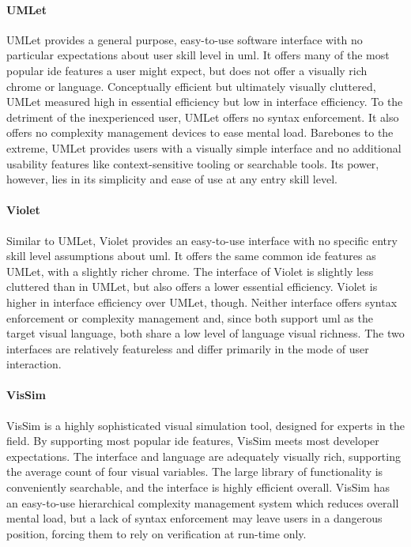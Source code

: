 \paragraph{UMLet} UMLet provides a general purpose, easy-to-use software
interface with no particular expectations about user skill level in
\ac{uml}. It offers many of the most popular \ac{ide} features a user might
expect, but does not offer a visually rich chrome or language. Conceptually
efficient but ultimately visually cluttered, UMLet measured high in
essential efficiency but low in interface efficiency. To the detriment of
the inexperienced user, UMLet offers no syntax enforcement. It also offers
no complexity management devices to ease mental load. Barebones to the
extreme, UMLet provides users with a visually simple interface and no
additional usability features like context-sensitive tooling or searchable
tools. Its power, however, lies in its simplicity and ease of use at any
entry skill level.

\paragraph{Violet} Similar to UMLet, Violet provides an easy-to-use
interface with no specific entry skill level assumptions about \ac{uml}. It
offers the same common \ac{ide} features as UMLet, with a slightly richer
chrome. The interface of Violet is slightly less cluttered than in UMLet,
but also offers a lower essential efficiency. Violet is higher in interface
efficiency over UMLet, though. Neither interface offers syntax enforcement
or complexity management and, since both support \ac{uml} as the target
visual language, both share a low level of language visual richness. The
two interfaces are relatively featureless and differ primarily in the mode
of user interaction.

\paragraph{VisSim} VisSim is a highly sophisticated visual simulation tool,
designed for experts in the field. By supporting most popular \ac{ide}
features, VisSim meets most developer expectations. The interface and
language are adequately visually rich, supporting the average count of four
visual variables. The large library of functionality is conveniently
searchable, and the interface is highly efficient overall. VisSim has an
easy-to-use hierarchical complexity management system which reduces overall
mental load, but a lack of syntax enforcement may leave users in a
dangerous position, forcing them to rely on verification at run-time only.

